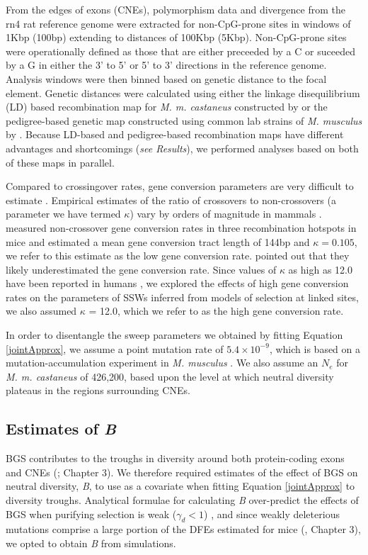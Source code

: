 	From the edges of exons (CNEs), polymorphism data and divergence from the rn4 rat reference genome were extracted for non-CpG-prone sites in windows of 1Kbp (100bp) extending to distances of 100Kbp (5Kbp). Non-CpG-prone sites were operationally defined as those that are either preceeded by a C or suceeded by a G in either the 3' to 5' or 5' to 3' directions in the reference genome. Analysis windows were then binned based on genetic distance to the focal element. Genetic distances were calculated using either the linkage disequilibrium (LD) based recombination map for \textit{M. m. castaneus} constructed by \cite{RN340} or the pedigree-based genetic map constructed using common lab strains of \textit{M. musculus} by \cite{RN232}. Because LD-based and pedigree-based recombination maps have different advantages and shortcomings (\textit{see Results}), we performed analyses based on both of these maps in parallel.

	Compared to crossingover rates, gene conversion parameters are very difficult to estimate \citep{RN247}. Empirical estimates of the ratio of crossovers to non-crossovers (a parameter we have termed $\kappa$) vary by orders of magnitude in mammals \citep{RN247}. \cite{RN263} measured non-crossover gene conversion rates in three recombination hotspots in mice and estimated a mean gene conversion tract length of 144bp and $\kappa = 0.105$, we refer to this estimate as the low gene conversion rate. \cite{RN263} pointed out that they likely underestimated the gene conversion rate. Since values of $\kappa$ as high as 12.0 have been reported in humans \citep{RN247}, we explored the effects of high gene conversion rates on the parameters of SSWs inferred from models of selection at linked sites, we also assumed $\kappa$ = 12.0, which we refer to as the high gene conversion rate. 

	In order to disentangle the sweep parameters we obtained by fitting Equation \ref{jointApprox}, we assume a point mutation rate of $5.4 \times 10^{-9}$, which is based on a mutation-accumulation experiment in \textit{M. musculus} \citep{RN228}. We also assume an $N_e$ for \textit{M. m. castaneus} of 426,200, based upon the level at which neutral diversity plateaus in the regions surrounding CNEs.

	\subsection{Estimates of \textit{B}} 
 
 	BGS contributes to the troughs in diversity around both protein-coding exons and CNEs (\citealt{RN122}; Chapter 3). We therefore required estimates of the effect of BGS on neutral diversity, \textit{B}, to use as a covariate when fitting Equation \ref{jointApprox} to diversity troughs. Analytical formulae for calculating \textit{B} over-predict the effects of BGS when purifying selection is weak ($\gamma_d < 1$) \citep{RN380,RN378}, and since weakly deleterious mutations comprise a large portion of the DFEs estimated for mice (\citealt{RN122}, Chapter 3), we opted to obtain \textit{B} from simulations.
 	
